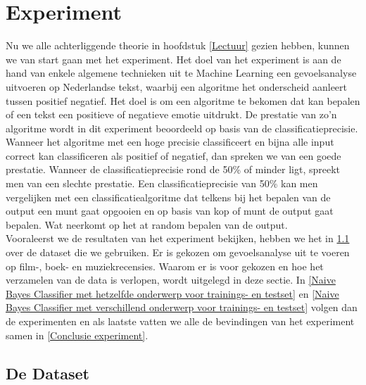 \chapter{Experiment}\label{Experiment}

Nu we alle achterliggende theorie in hoofdstuk \ref{Lectuur} gezien hebben, kunnen we van start gaan met het experiment. Het doel van het experiment is aan de hand van enkele algemene technieken uit te Machine Learning een gevoelsanalyse uitvoeren op Nederlandse tekst, waarbij een algoritme het onderscheid aanleert tussen positief negatief. Het doel is om een algoritme te bekomen dat kan bepalen of een tekst een positieve of negatieve emotie uitdrukt. De prestatie van zo'n algoritme wordt in dit experiment beoordeeld op basis van de classificatieprecisie.  Wanneer het algoritme met een hoge precisie classificeert en bijna alle input correct kan classificeren als positief of negatief, dan spreken we van een goede prestatie. Wanneer de classificatieprecisie rond de 50\% of minder ligt, spreekt men van een slechte prestatie. Een classificatieprecisie van 50\% kan men vergelijken met een classificatiealgoritme dat telkens bij het bepalen van de output een munt gaat opgooien en op basis van kop of munt de output gaat bepalen. Wat neerkomt op het at random bepalen van de output.\\
%
Vooraleerst we de resultaten van het experiment bekijken, hebben we het in \ref{De Dataset} over de dataset die we gebruiken. Er is gekozen om gevoelsanalyse uit te voeren op film-, boek- en muziekrecensies. Waarom er is voor gekozen en hoe het verzamelen van de data is verlopen, wordt uitgelegd in deze sectie. In \ref{Naive Bayes Classifier met hetzelfde onderwerp voor trainings- en testset} en \ref{Naive Bayes Classifier met verschillend onderwerp voor trainings- en testset} volgen dan de experimenten en als laatste vatten we alle de bevindingen van het experiment samen in \ref{Conclusie experiment}.

\section{De Dataset}\label{De Dataset}

